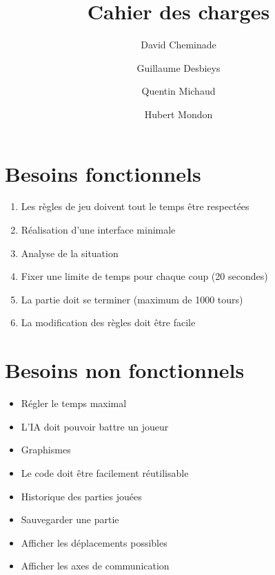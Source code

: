 \documentclass[12pt]{article}
\title{Cahier des charges}
\author{
	David Cheminade
	\and
	Guillaume Desbieys
	\and
	Quentin Michaud
	\and
	Hubert Mondon
}
\date{}
\begin{document}
 
	\maketitle{}                             

	\section{Besoins fonctionnels}    


		\begin{enumerate}
			\item Les règles de jeu doivent tout le temps être respectées
			\item Réalisation d'une interface minimale
			\item Analyse de la situation
			\item Fixer une limite de temps pour chaque coup (20 secondes)
			\item La partie doit se terminer (maximum de 1000 tours)
			\item La modification des règles doit être facile
		\end{enumerate}

	\section{Besoins non fonctionnels} 

		\begin{itemize}
			\item Régler le temps maximal
			\item L'IA doit pouvoir battre un joueur
			\item Graphismes
			\item Le code doit être facilement réutilisable
			\item Historique des parties jouées
			\item Sauvegarder une partie
			\item Afficher les déplacements possibles
			\item Afficher les axes de communication
		\end{itemize}

	
\end{document}
